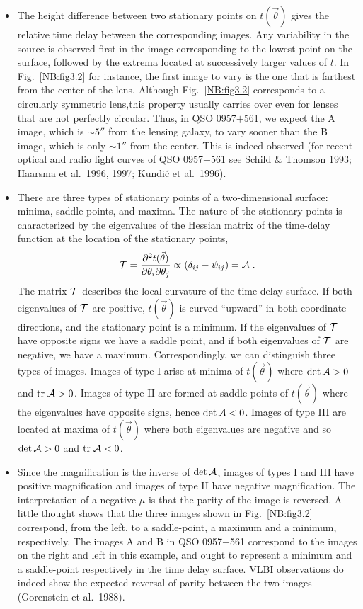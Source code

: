 \documentclass[a4paper,10pt]{article} %
\newcommand{\tr}{\mathrel{\rm tr}}
\begin{document}
\begin{itemize}

\item[1] The height difference between two stationary points on
$t(\vec\theta)$ gives the relative time delay between the
corresponding images. Any variability in the source is observed first
in the image corresponding to the lowest point on the surface,
followed by the extrema located at successively larger values of
$t$. In Fig.\ \ref{NB:fig3.2} for instance, the first image to vary is
the one that is farthest from the center of the lens. Although Fig.\
\ref{NB:fig3.2} corresponds to a circularly symmetric lens,this
property usually carries over even for lenses that are not perfectly
circular. Thus, in QSO 0957$+$561, we expect the A image, which is
$\sim5''$ from the lensing galaxy, to vary sooner than the B image,
which is only $\sim1''$ from the center. This is indeed observed (for
recent optical and radio light curves of QSO 0957+561 see Schild \&
Thomson 1993; Haarsma et al.\ 1996, 1997; Kundi\'c et al.\ 1996).

\item[2] There are three types of stationary points of a
two-dimensional surface: minima, saddle points, and maxima. The nature
of the stationary points is characterized by the eigenvalues of the
Hessian matrix of the time-delay function at the location of the
stationary points,
\begin{equation}
  {\cal T} =
  \frac{\partial^2t(\vec\theta)}{\partial\theta_i\partial\theta_j}
  \propto \left(\delta_{ij}-\psi_{ij}\right) = {\cal A} \;.
\label{eq:3.27}
\end{equation}
The matrix ${\cal T}$ describes the local curvature of the time-delay
surface. If both eigenvalues of ${\cal T}$ are positive,
$t(\vec\theta)$ is curved ``upward'' in both coordinate directions,
and the stationary point is a minimum. If the eigenvalues of ${\cal
T}$ have opposite signs we have a saddle point, and if both
eigenvalues of ${\cal T}$ are negative, we have a maximum.
Correspondingly, we can distinguish three types of images. Images of
type I arise at minima of $t(\vec\theta)$ where $\det{\cal A}>0$ and
$\tr{\cal A}>0$. Images of type II are formed at saddle points of
$t(\vec\theta)$ where the eigenvalues have opposite signs, hence
$\det{\cal A}<0$. Images of type III are located at maxima of
$t(\vec\theta)$ where both eigenvalues are negative and so $\det{\cal
A}>0$ and $\tr{\cal A}<0$.

\item[3] Since the magnification is the inverse of $\det{\cal A}$,
images of types I and III have positive magnification and images of
type II have negative magnification. The interpretation of a negative
$\mu$ is that the parity of the image is reversed. A little thought
shows that the three images shown in Fig.\ \ref{NB:fig3.2} correspond,
from the left, to a saddle-point, a maximum and a minimum,
respectively. The images A and B in QSO 0957$+$561 correspond to the
images on the right and left in this example, and ought to represent a
minimum and a saddle-point respectively in the time delay
surface. VLBI observations do indeed show the expected reversal of
parity between the two images (Gorenstein et al.\ 1988).


\end{itemize}
\end{document}
